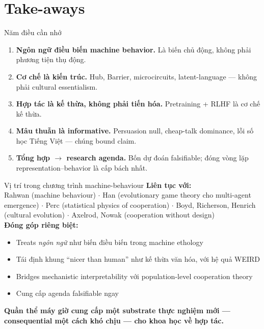 \documentclass[11pt,aspectratio=169]{beamer}
\newcommand{\takeaway}[1]{%
  \begin{center}
    \colorbox{rsnavy!10}{%
      \begin{minipage}{0.92\textwidth}
        \centering\textbf{#1}
      \end{minipage}}
  \end{center}}
\begin{document}
\section{Take-aways}

\begin{frame}{Năm điều cần nhớ}
    \large
    \begin{enumerate}
        \setlength\itemsep{0.5em}
        \item \textbf{Ngôn ngữ điều biến machine behavior.} Là biến chủ động, không phải phương tiện thụ động.
        \item \textbf{Cơ chế là kiến trúc.} Hub, Barrier, microcircuits, latent-language --- không phải cultural essentialism.
        \item \textbf{Hợp tác là kế thừa, không phải tiến hóa.} Pretraining + RLHF là cơ chế kế thừa.
        \item \textbf{Mâu thuẫn là informative.} Persuasion null, cheap-talk dominance, lỗi số học Tiếng Việt --- chúng bound claim.
        \item \textbf{Tổng hợp $\rightarrow$ research agenda.} Bốn dự đoán falsifiable; đóng vòng lặp representation--behavior là cấp bách nhất.
    \end{enumerate}
\end{frame}

\begin{frame}{Vị trí trong chương trình machine-behaviour}
    \large
    \textbf{Liên tục với:}\\
    \footnotesize Rahwan (machine behaviour) $\cdot$ Han (evolutionary game theory cho multi-agent emergence) $\cdot$ Perc (statistical physics of cooperation) $\cdot$ Boyd, Richerson, Henrich (cultural evolution) $\cdot$ Axelrod, Nowak (cooperation without design)
    \vspace{0.5cm}\\
    \normalsize\textbf{Đóng góp riêng biệt:}
    \begin{itemize}
        \setlength\itemsep{0.3em}
        \item Treats \emph{ngôn ngữ} như biến điều biến trong machine ethology
        \item Tái định khung ``nicer than human'' như kế thừa văn hóa, với hệ quả WEIRD
        \item Bridges mechanistic interpretability với population-level cooperation theory
        \item Cung cấp agenda falsifiable ngay
    \end{itemize}
    \vspace{0.5cm}
    \takeaway{Quần thể máy giờ cung cấp một substrate thực nghiệm mới --- consequential một cách khó chịu --- cho khoa học về hợp tác.}
\end{frame}
\end{document}

